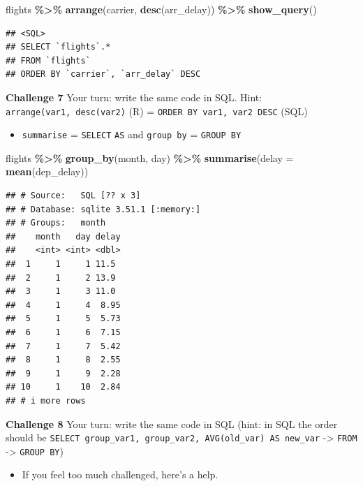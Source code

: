 \documentclass[
]{book}
\newenvironment{Shaded}{\begin{snugshade}}{\end{snugshade}}
\newcommand{\AttributeTok}[1]{\textcolor[rgb]{0.13,0.29,0.53}{#1}}
\newcommand{\FunctionTok}[1]{\textcolor[rgb]{0.13,0.29,0.53}{\textbf{#1}}}
\newcommand{\NormalTok}[1]{#1}
\newcommand{\SpecialCharTok}[1]{\textcolor[rgb]{0.81,0.36,0.00}{\textbf{#1}}}
\providecommand{\tightlist}{%
  \setlength{\itemsep}{0pt}\setlength{\parskip}{0pt}}
\begin{document}
\begin{Shaded}
\begin{Highlighting}[]
\NormalTok{flights }\SpecialCharTok{\%\textgreater{}\%} 
  \FunctionTok{arrange}\NormalTok{(carrier, }\FunctionTok{desc}\NormalTok{(arr\_delay)) }\SpecialCharTok{\%\textgreater{}\%}
  \FunctionTok{show\_query}\NormalTok{()}
\end{Highlighting}
\end{Shaded}

\begin{verbatim}
## <SQL>
## SELECT `flights`.*
## FROM `flights`
## ORDER BY `carrier`, `arr_delay` DESC
\end{verbatim}

\textbf{Challenge 7}
Your turn: write the same code in SQL.
Hint: \texttt{arrange(var1,\ desc(var2)} (R) = \texttt{ORDER\ BY\ var1,\ var2\ DESC} (SQL)

\begin{itemize}
\tightlist
\item
  \texttt{summarise} = \texttt{SELECT} \texttt{AS} and \texttt{group\ by} = \texttt{GROUP\ BY}
\end{itemize}

\begin{Shaded}
\begin{Highlighting}[]
\NormalTok{flights }\SpecialCharTok{\%\textgreater{}\%}
  \FunctionTok{group\_by}\NormalTok{(month, day) }\SpecialCharTok{\%\textgreater{}\%}
  \FunctionTok{summarise}\NormalTok{(}\AttributeTok{delay =} \FunctionTok{mean}\NormalTok{(dep\_delay)) }
\end{Highlighting}
\end{Shaded}

\begin{verbatim}
## # Source:   SQL [?? x 3]
## # Database: sqlite 3.51.1 [:memory:]
## # Groups:   month
##    month   day delay
##    <int> <int> <dbl>
##  1     1     1 11.5 
##  2     1     2 13.9 
##  3     1     3 11.0 
##  4     1     4  8.95
##  5     1     5  5.73
##  6     1     6  7.15
##  7     1     7  5.42
##  8     1     8  2.55
##  9     1     9  2.28
## 10     1    10  2.84
## # i more rows
\end{verbatim}

\textbf{Challenge 8}
Your turn: write the same code in SQL (hint: in SQL the order should be \texttt{SELECT\ group\_var1,\ group\_var2,\ AVG(old\_var)\ AS\ new\_var} -\textgreater{} \texttt{FROM} -\textgreater{} \texttt{GROUP\ BY})

\begin{itemize}
\tightlist
\item
  If you feel too much challenged, here's a help.
\end{itemize}
\end{document}
